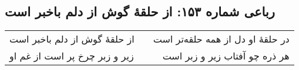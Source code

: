 \begin{center}
\section*{رباعی شماره ۱۵۳: از حلقهٔ گوش از دلم باخبر است}
\label{sec:0153}
\begin{longtable}{l p{0.5cm} r}
از حلقهٔ گوش از دلم باخبر است
&&
در حلقهٔ او دل از همه حلقه‌تر است
\\
زیر و زبر چرخ پر است از غم او
&&
هر ذره چو آفتاب زیر و زبر است
\\
\end{longtable}
\end{center}
